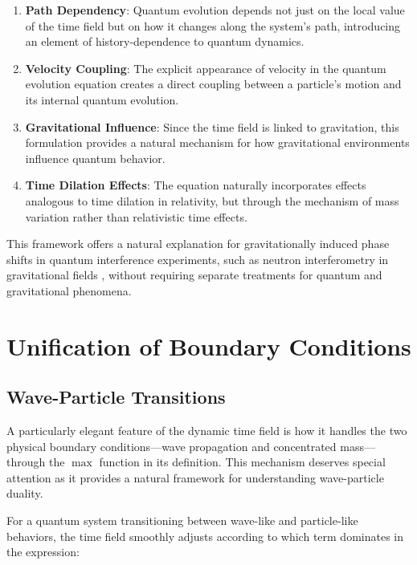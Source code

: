 \documentclass[12pt,a4paper]{article}
\begin{document}
	\begin{enumerate}
		\item \textbf{Path Dependency}: Quantum evolution depends not just on the local value of the time field but on how it changes along the system's path, introducing an element of history-dependence to quantum dynamics.
		
		\item \textbf{Velocity Coupling}: The explicit appearance of velocity in the quantum evolution equation creates a direct coupling between a particle's motion and its internal quantum evolution.
		
		\item \textbf{Gravitational Influence}: Since the time field is linked to gravitation, this formulation provides a natural mechanism for how gravitational environments influence quantum behavior.
		
		\item \textbf{Time Dilation Effects}: The equation naturally incorporates effects analogous to time dilation in relativity, but through the mechanism of mass variation rather than relativistic time effects.
	\end{enumerate}
	
	This framework offers a natural explanation for gravitationally induced phase shifts in quantum interference experiments, such as neutron interferometry in gravitational fields \cite{Colella1975}, without requiring separate treatments for quantum and gravitational phenomena.
	
	\section{Unification of Boundary Conditions}
	\label{sec:boundary_conditions}
	
	\subsection{Wave-Particle Transitions}
	\label{subsec:wave_particle}
	
	A particularly elegant feature of the dynamic time field is how it handles the two physical boundary conditions—wave propagation and concentrated mass—through the $\max$ function in its definition. This mechanism deserves special attention as it provides a natural framework for understanding wave-particle duality.
	
	For a quantum system transitioning between wave-like and particle-like behaviors, the time field smoothly adjusts according to which term dominates in the expression:
	
\end{document}
